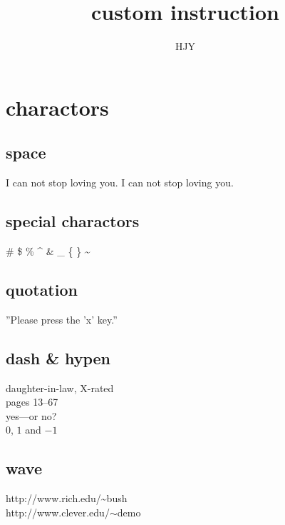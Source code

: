 \documentclass[10pt,a4paper]{article}
\author{HJY}
\title{custom instruction}
\begin{document}
\maketitle							%
\tableofcontents						%
\section{charactors}
\subsection{space}
I can not stop loving     you.
\newline
I can not stop loving you.

\subsection{special charactors}
\# \$ \% \^{} \& \_ \{ \} \~{}


\subsection{quotation}
''Please press the 'x' key.''


\subsection{dash \& hypen}
daughter-in-law, X-rated\\
pages 13--67\\
yes---or no? \\
$0$, $1$ and $-1$


\subsection{wave}
http://www.rich.edu/\~{}bush \\
http://www.clever.edu/$\sim$demo
\end{document}
